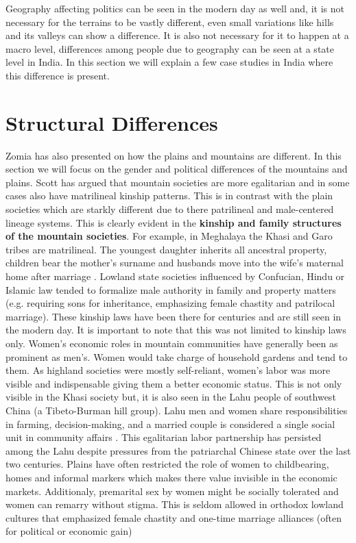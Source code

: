 Geography affecting politics can be seen in the modern day as well and, it is not necessary for the terrains to be vastly different, even small variations like hills and its valleys can show a difference. It is also not necessary for it to happen at a macro level, differences among people due to geography can be seen at a state level in India. In this section we will explain a few case studies in India where this difference is present. 

\section{Structural Differences}

Zomia has also presented on how the plains and mountains are different. In this section we will focus on the gender and political differences of the mountains and plains. Scott has argued that mountain societies are more egalitarian and in some cases also have matrilineal kinship patterns. This is in contrast with the plain societies which are starkly different due to there patrilineal and male-centered lineage systems. This is clearly evident in the \textbf{kinship and family structures of the mountain societies}. For example, in Meghalaya the Khasi and Garo tribes are matrilineal. The youngest daughter inherits all ancestral property, children bear the mother's surname and husbands move into the wife’s maternal home after marriage \citep{Allen_2012}. Lowland state societies influenced by Confucian, Hindu or Islamic law tended to formalize male authority in family and property matters (e.g. requiring sons for inheritance, emphasizing female chastity and patrilocal marriage). These kinship laws have been there for centuries and are still seen in the modern day. It is important to note that this was not limited to kinship laws only. Women’s economic roles in mountain communities have generally been as prominent as men’s. Women would take charge of household gardens and tend to them. As highland societies were mostly self-reliant, women's labor was more visible and indispensable giving them a better economic status. This is not only visible in the Khasi society but, it is also seen in the Lahu people of southwest China (a Tibeto-Burman hill group). Lahu men and women share responsibilities in farming, decision-making,  and a married couple is considered a single social unit in community affairs \citep{Du_2015}. This egalitarian labor partnership has persisted among the Lahu despite pressures from the patriarchal Chinese state over the last two centuries. Plains have often restricted the role of women to childbearing, homes and informal markers which makes there value invisible in the economic markets. Additionaly, premarital sex by women might be socially tolerated and women can remarry without stigma. This is seldom allowed in orthodox lowland cultures that emphasized female chastity and one-time marriage alliances (often for political or economic gain)
